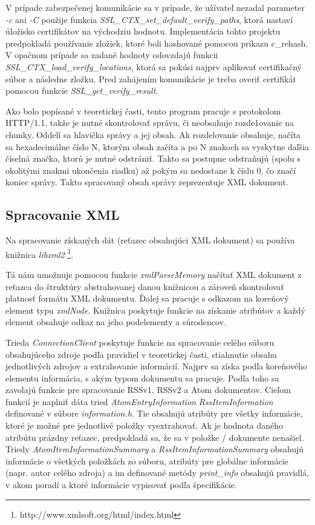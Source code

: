 \documentclass[11pt,a4paper]{article}
\begin{document}
V prípade zabezpečenej komunikácie sa v prípade, že užívateľ nezadal parameter \textit{-c} ani \textit{-C} použije funkcia \textit{SSL\_CTX\_set\_default\_verify\_paths}, ktorá nastaví úložisko certifikátov na východziu hodnotu. Implementácia tohto projektu predpokladá používanie zložiek, ktoré boli hashované pomocou príkazu c\_rehash. V opačnom prípade sa zadané hodnoty odovzdajú funkcii \textit{SSL\_CTX\_load\_verify\_locations}, ktorá sa pokúsi najprv aplikovať certifikačný súbor a následne zložku. Pred zahájením komunikácie je treba overiť certifikát pomocou funkcie \textit{SSL\_get\_verify\_result}.

Ako bolo popísané v teoretickej časti, tento program pracuje s protokolom HTTP/1.1, takže je nutné skontrolovať správu, či neobsahuje rozde1ovanie na chunky. Oddelí sa hlavička správy a jej obsah. Ak rozdelovanie obsahuje, načíta sa hexadecimálne číslo N, ktorým obsah začíta a po N znakoch sa vyskytne daľšia číselná značka, ktorú je nutné odstrániť. Takto sa postupne odstraňujú (spolu s okolitými znakmi ukončenia riadku) až pokým sa nedostane k číslu 0, čo značí koniec správy. Takto spracovaný obsah správy reprezentuje XML dokument.

\subsection{Spracovanie XML}

Na spracovanie získaných dát (reťazec obsahujúci XML dokument) sa používa knižnica \textit{libxml2} \footnote{http://www.xmlsoft.org/html/index.html}.

Tá nám umožnuje pomocou funkcie \textit{xmlParseMemory} načítať XML dokument z reťazca do štruktúry abstrahovanej danou knižnicou a zároveň skontrolovať platnosť formátu XML dokumentu. Ďalej sa pracuje s odkazom na koreňový element typu \textit{xmlNode}. Knižnica poskytuje funkcie na získanie atribútov a každý element obsahuje odkaz na jeho podelementy a súrodencov.

Trieda \textit{ConnectionClient} poskytuje funkcie na spracovanie celého súboru obsahujúceho zdroje podľa pravidiel v teoretickej časti, stiahnutie obsahu jednotlivých zdrojov a extrahovanie informácií. Najprv sa získa podľa koreňového elementu informácia, s akým typom dokumentu sa pracuje. Podľa toho sa zavolajú funkcie pre spracovanie RSSv1, RSSv2 a Atom dokumentov.
Cieľom funkcií je naplniť dáta tried \textit{AtomEntryInformation} \textit{RssItemInformation} definované v súbore \textit{information.h}.
Tie obsahujú atribúty pre všetky informácie, ktoré je možné pre jednotlivé položky vyextrahovať. Ak je hodnota daného atribútu prázdny reťazec, predpokladá sa, že sa v položke / dokumente nenašiel.
Triedy \textit{AtomItemInformationSummary} a \textit{RssItemInformationSummary} obsahujú informácie o všetkých položkách zo súboru, atribúty pre globálne informácie (napr. autor celého zdroja) a im definované metódy \textit{print\_info} obsahujú pravidlá, v akom poradí a ktoré informácie vypisovať podľa špecifikácie.
\end{document}
